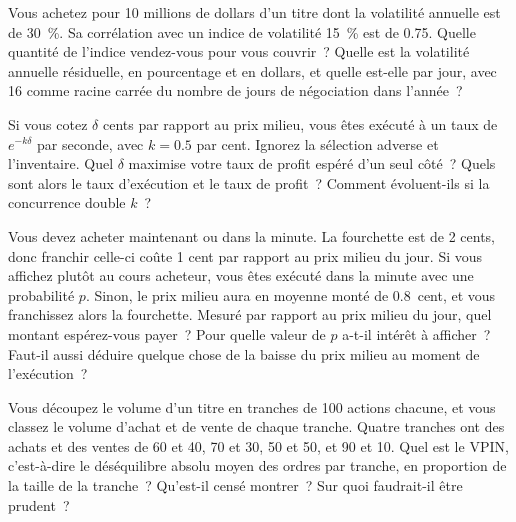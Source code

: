 \begin{question}\label{iq:iv2:markets-and-microstructure:30}
Vous achetez pour 10 millions de dollars d'un titre dont la volatilité annuelle est de 30~\%. Sa corrélation avec un indice de volatilité 15~\% est de 0.75. Quelle quantité de l'indice vendez-vous pour vous couvrir~? Quelle est la volatilité annuelle résiduelle, en pourcentage et en dollars, et quelle est-elle par jour, avec 16 comme racine carrée du nombre de jours de négociation dans l'année~?
\end{question}

\begin{question}\label{iq:iv2:markets-and-microstructure:31}
Si vous cotez $\delta$ cents par rapport au prix milieu, vous êtes exécuté à un taux de $e^{-k\delta}$ par seconde, avec $k = 0.5$ par cent. Ignorez la sélection adverse et l'inventaire. Quel $\delta$ maximise votre taux de profit espéré d'un seul côté~? Quels sont alors le taux d'exécution et le taux de profit~? Comment évoluent-ils si la concurrence double $k$~?
\end{question}

\begin{question}\label{iq:iv2:markets-and-microstructure:32}
Vous devez acheter maintenant ou dans la minute. La fourchette est de 2 cents, donc franchir celle-ci coûte 1 cent par rapport au prix milieu du jour. Si vous affichez plutôt au cours acheteur, vous êtes exécuté dans la minute avec une probabilité $p$. Sinon, le prix milieu aura en moyenne monté de 0.8~cent, et vous franchissez alors la fourchette. Mesuré par rapport au prix milieu du jour, quel montant espérez-vous payer~? Pour quelle valeur de $p$ a-t-il intérêt à afficher~? Faut-il aussi déduire quelque chose de la baisse du prix milieu au moment de l'exécution~?
\end{question}

\begin{question}\label{iq:iv2:markets-and-microstructure:33}
Vous découpez le volume d'un titre en tranches de 100 actions chacune, et vous classez le volume d'achat et de vente de chaque tranche. Quatre tranches ont des achats et des ventes de 60 et 40, 70 et 30, 50 et 50, et 90 et 10. Quel est le VPIN, c'est-à-dire le déséquilibre absolu moyen des ordres par tranche, en proportion de la taille de la tranche~? Qu'est-il censé montrer~? Sur quoi faudrait-il être prudent~?
\end{question}

